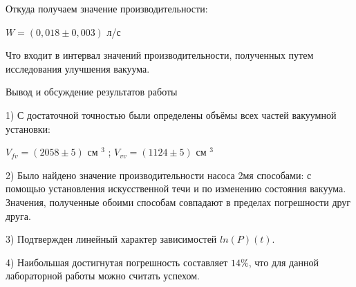 \documentclass{article}
\begin{document}
Откуда получаем значение производительности:
\begin{center}
    \(W = (0,018 \pm 0,003)\) л/с
\end{center}

Что входит в интервал значений производительности, полученных путем исследования улучшения вакуума.

\begin{center}
    \raggedleft
    {
        \LARGE {Вывод и обсуждение результатов работы}
    }
    \hline
    \hline
\end{center}

1) С достаточной точностью были определены объёмы всех частей вакуумной установки:

\begin{center}
    \(V_{fv} = (2058 \pm 5)\) см \(^{3}\) ;\; \(V_{vv} = (1124 \pm 5)\) см \(^{3}\)
\end{center}

2) Было найдено значение производительности насоса 2мя способами: с помощью установления искусственной течи и по изменению состояния вакуума. Значения, полученные обоими способам совпадают в пределах погрешности друг друга.

3) Подтвержден линейный характер зависимостей \(ln (P) (t)\).

4) Наибольшая достигнутая погрешность составляет \(14\%\), что для данной лабораторной работы можно считать успехом.
\end{document}

